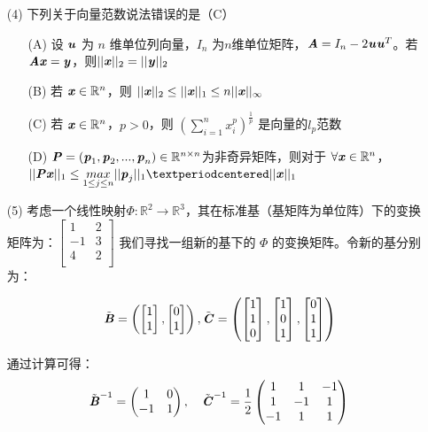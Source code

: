 \documentclass[12pt,a4paper,openany,twoside]{ctexbook}
\begin{document}
\begin{exercise}
\begin{itemize}
		\item [(4)] 下列关于向量范数说法错误的是（C）
		\begin{itemize}
			\item [(A)] 设 $\boldsymbol{\mathit{u}}$ 为 $n$ 维单位列向量，$I_n$ 为$n$维单位矩阵，$\boldsymbol{\mathit{A}}=I_n-2\boldsymbol{\mathit{u}}\boldsymbol{\mathit{u}}^T$。若$\boldsymbol{\mathit{A}}\boldsymbol{\mathit{x}}=\boldsymbol{\mathit{y}}$，则$||\boldsymbol{\mathit{x}}||_{2}=||\boldsymbol{\mathit{y}}||_{2}$
			\item [(B)] 若 $\boldsymbol{\mathit{x}}\in {\mathbb{R}}^n$，则 $||\boldsymbol{\mathit{x}}||_{2}\leq||\boldsymbol{\mathit{x}}||_{1}\leq n||\boldsymbol{\mathit{x}}||_{\infty}$
			\item [(C)] 若 $\boldsymbol{\mathit{x}}\in {\mathbb{R}}^n$，$p>0$，则 $(\sum_{i=1}^{n} x_i^p)^{\frac{1}{p}}$ 是向量的$l_p$范数
			\item [(D)] $\boldsymbol{\mathit{P}}=(\boldsymbol{\mathit{p}}_1,\boldsymbol{\mathit{p}}_2,...,\boldsymbol{\mathit{p}}_n)\in \mathbb{R}^{n \times n}$为非奇异矩阵，则对于 $\forall \boldsymbol{\mathit{x}}\in {\mathbb{R}}^n$，$||\MP\Vx||_1 \leq \underset {1 \leq j \leq n}{max} ||\Vp_j||_1 · ||\Vx||_1$
		\end{itemize}

		\item [(5)] 考虑一个线性映射$\Phi: \mathbb{R}^2 \to \mathbb{R}^3 $，其在标准基（基矩阵为单位阵）下的变换矩阵为：$\begin{bmatrix}
			1 & 2 \\
			-1 & 3 \\
			4 & 2  \\
			\end{bmatrix}$
			我们寻找一组新的基下的 $\Phi$ 的变换矩阵。令新的基分别为：

			$$
			\tilde{\boldsymbol{\mathit{B}}} = 
			\left(
			\begin{bmatrix}
			1 \\ 1 
			\end{bmatrix},
			\begin{bmatrix}
			0 \\ 1
			\end{bmatrix}
			\right),
			\tilde{\boldsymbol{\mathit{C}}} = 
			\left(
			\begin{bmatrix}
			1 \\ 1 \\ 0
			\end{bmatrix},
			\begin{bmatrix}
			1 \\ 0 \\ 1 
			\end{bmatrix},
			\begin{bmatrix}
			0 \\ 1 \\ 1
			\end{bmatrix}
			\right)
			$$
			
			通过计算可得：
			$$
		 {\tilde{\boldsymbol{\mathit{B}}}^{-1}} = 
			\begin{pmatrix}
			1 & 0  \\
			-1 & 1 \\
			\end{pmatrix},
			\quad
			{\tilde{\boldsymbol{\mathit{C}}}^{-1}} = 
			\frac{1}{2}
			\begin{pmatrix}
			1 & 1 & -1 \\
			1 & -1 & 1 \\
			-1 & 1 & 1 \\
			\end{pmatrix}
			$$
			

\end{itemize}
\end{exercise}
\end{document}
